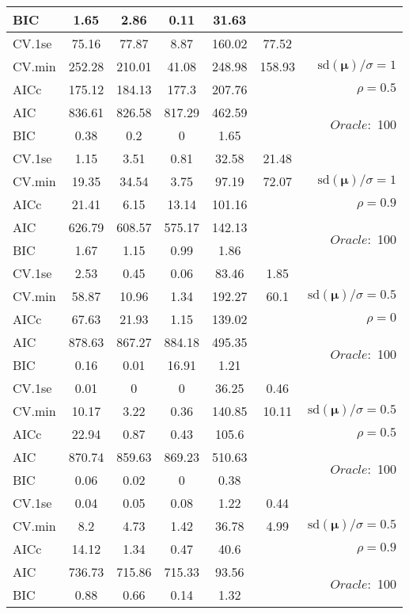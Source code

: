 \begin{table}
\begin{center}
\begin{tabular}{l*{5}{c}|r}
BIC & 1.65 & 2.86 & 0.11 & 31.63 & &  \\
 \hline 
CV.1se & 75.16 & 77.87 & 8.87 & 160.02 & 77.52 & \\
CV.min & 252.28 & 210.01 & 41.08 & 248.98 & 158.93 &  $\mathrm{sd}(\mathbf{\mu})/\sigma=1$ \\
AICc & 175.12 & 184.13 & 177.3 & 207.76 & & $\rho=0.5$ \\
AIC & 836.61 & 826.58 & 817.29 & 462.59 & &  \multirow{2}{*}{$Oracle: $ 100} \\
BIC & 0.38 & 0.2 & 0 & 1.65 & &  \\
 \hline 
CV.1se & 1.15 & 3.51 & 0.81 & 32.58 & 21.48 & \\
CV.min & 19.35 & 34.54 & 3.75 & 97.19 & 72.07 &  $\mathrm{sd}(\mathbf{\mu})/\sigma=1$ \\
AICc & 21.41 & 6.15 & 13.14 & 101.16 & & $\rho=0.9$ \\
AIC & 626.79 & 608.57 & 575.17 & 142.13 & &  \multirow{2}{*}{$Oracle: $ 100} \\
BIC & 1.67 & 1.15 & 0.99 & 1.86 & &  \\
 \hline 
CV.1se & 2.53 & 0.45 & 0.06 & 83.46 & 1.85 & \\
CV.min & 58.87 & 10.96 & 1.34 & 192.27 & 60.1 &  $\mathrm{sd}(\mathbf{\mu})/\sigma=0.5$ \\
AICc & 67.63 & 21.93 & 1.15 & 139.02 & & $\rho=0$ \\
AIC & 878.63 & 867.27 & 884.18 & 495.35 & &  \multirow{2}{*}{$Oracle: $ 100} \\
BIC & 0.16 & 0.01 & 16.91 & 1.21 & &  \\
 \hline 
CV.1se & 0.01 & 0 & 0 & 36.25 & 0.46 & \\
CV.min & 10.17 & 3.22 & 0.36 & 140.85 & 10.11 &  $\mathrm{sd}(\mathbf{\mu})/\sigma=0.5$ \\
AICc & 22.94 & 0.87 & 0.43 & 105.6 & & $\rho=0.5$ \\
AIC & 870.74 & 859.63 & 869.23 & 510.63 & &  \multirow{2}{*}{$Oracle: $ 100} \\
BIC & 0.06 & 0.02 & 0 & 0.38 & &  \\
 \hline 
CV.1se & 0.04 & 0.05 & 0.08 & 1.22 & 0.44 & \\
CV.min & 8.2 & 4.73 & 1.42 & 36.78 & 4.99 &  $\mathrm{sd}(\mathbf{\mu})/\sigma=0.5$ \\
AICc & 14.12 & 1.34 & 0.47 & 40.6 & & $\rho=0.9$ \\
AIC & 736.73 & 715.86 & 715.33 & 93.56 & &  \multirow{2}{*}{$Oracle: $ 100} \\
BIC & 0.88 & 0.66 & 0.14 & 1.32 & &  \\
 \hline 
\end{tabular}
\end{center}
\vspace{-1cm}
\end{table}





